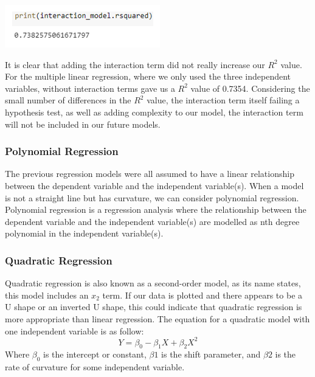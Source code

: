 \documentclass[a4paper,12pt]{report}
\begin{document}
\begin{center}
    \captionsetup{type=figure}
    \includegraphics[width=.9\linewidth]{media/rsquaredmodel.png}
    \label{fig:rsquaredmodel}
\end{center}

It is clear that adding the interaction term did not really increase our $R^2$ value. For the multiple linear regression, where we only used the three independent variables, without interaction terms gave us a $R^2$ value of 0.7354. Considering the small number of differences in the $R^2$ value, the interaction term itself failing a hypothesis test, as well as adding complexity to our model, the interaction term will not be included in our future models.

\subsubsection{Polynomial Regression}
The previous regression models were all assumed to have a linear relationship between the dependent variable and the independent variable(s). When a model is not a straight line but has curvature, we can consider polynomial regression. Polynomial regression is a regression analysis where the relationship between the dependent variable and the independent variable(s) are modelled as nth degree polynomial in the independent variable(s).
 
\subsubsection{Quadratic Regression}
Quadratic regression is also known as a second-order model, as its name states, this model includes an $x_2$ term. If our data is plotted and there appears to be a U shape or an inverted U shape, this could indicate that quadratic regression is more appropriate than linear regression. The equation for a quadratic model with one independent variable is as follow:
$$Y=\beta_0-\beta_1X+\beta_2X^2$$
Where $\beta_0$ is the intercept or constant, $\beta1$ is the shift parameter, and $\beta2$ is the rate of curvature for some independent variable.
\end{document}
